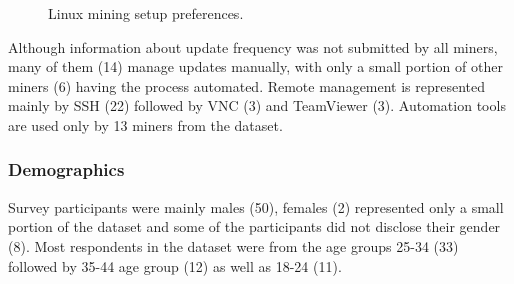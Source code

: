 \documentclass[
  printed, %
  table,   %
  lof,     %
  lot,     %
           oneside, color
]{fithesis3}
\begin{document}
\vspace{-2em}
\begin{center}
\begin{figure}[H]
\caption{Linux mining setup preferences.}
\label{chart:windowshabbits}\end{figure}\end{center}
\vspace{-1em}
Although information about update frequency was not submitted by all miners, many of them (14) manage updates manually, with only a small portion of other miners (6) having the process automated. Remote management is represented mainly by SSH (22) followed by VNC (3) and TeamViewer (3). Automation tools are used only by 13 miners from the dataset.
\subsubsection{Demographics}
Survey participants were mainly males (50), females (2) represented only a small portion of the dataset and some of the participants did not disclose their gender (8). Most respondents in the dataset were from the age groups 25-34 (33) followed by 35-44 age group (12) as well as 18-24 (11).
\end{document}
